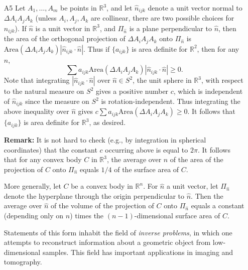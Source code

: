 \documentclass[amssymb,twocolumn,pra,10pt,aps]{revtex4-1}
\begin{document}
\begin{itemize}
\item[A5]
Let $A_1,\ldots,A_m$ be points in $\mathbb{R}^3$, and let $\hat{n}_{ijk}$ denote a unit vector normal to $\Delta A_iA_jA_k$ (unless $A_i,A_j,A_k$ are collinear, there are two possible choices for $\hat{n}_{ijk}$). If $\hat{n}$ is a unit vector in $\mathbb{R}^3$, and $\Pi_{\hat{n}}$ is a plane perpendicular to $\hat{n}$, then the area of the orthogonal projection of $\Delta A_iA_jA_k$ onto $\Pi_{\hat{n}}$ is $\text{Area}(\Delta A_iA_jA_k) |\hat{n}_{ijk} \cdot \hat{n}|$. Thus if $\{a_{ijk}\}$ is area definite for $\mathbb{R}^2$, then for any $\hat{n}$,
\[
\sum a_{ijk} \text{Area}(\Delta A_iA_jA_k) |\hat{n}_{ijk} \cdot \hat{n}| \geq 0.
\]
Note that integrating $|\hat{n}_{ijk} \cdot \hat{n}|$ over $\hat{n} \in S^2$, the unit sphere in $\mathbb{R}^3$, with respect to the natural measure on $S^2$ gives a positive number $c$, which is independent of $\hat{n}_{ijk}$ since the measure on $S^2$ is rotation-independent. Thus integrating the above inequality over $\hat{n}$ gives
$c \sum a_{ijk} \text{Area}(\Delta A_iA_jA_k) \geq 0$. It follows that $\{a_{ijk}\}$ is area definite for $\mathbb{R}^3$, as desired. 

\noindent
\textbf{Remark:}
It is not hard to check (e.g., by integration in spherical coordinates) that the constant $c$ occurring above is equal to $2\pi$. It follows that for any convex body $C$ in $\mathbb{R}^3$, the average over $\hat{n}$ of the area of the projection of $C$ onto $\Pi_{\hat{n}}$ equals $1/4$ of the surface area of $C$. 

More generally, let $C$ be a convex body in $\mathbb{R}^n$.
For $\hat{n}$ a unit vector, let $\Pi_{\hat{n}}$ denote the hyperplane through the origin perpendicular to $\hat{n}$. Then the average over $\hat{n}$ of the volume of the projection of $C$ onto $\Pi_{\hat{n}}$ equals a constant (depending only on $n$) times the $(n-1)$-dimensional surface area of $C$. 

Statements of this form inhabit the field of \emph{inverse problems}, in which one attempts to reconstruct information about a geometric object from low-dimensional samples. This field has important applications in imaging and tomography.


\end{itemize}
\end{document}

